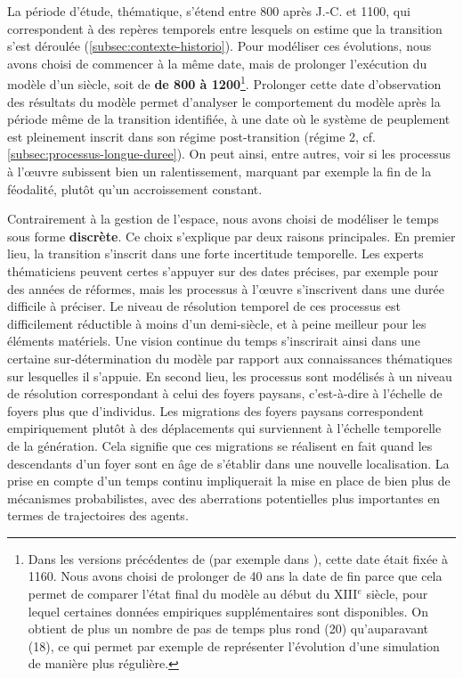 La période d'étude, thématique, s'étend entre 800 après J.-C. et 1100, qui correspondent à des repères temporels entre lesquels on estime que la transition s'est déroulée (\cref{subsec:contexte-historio}).
Pour modéliser ces évolutions, nous avons choisi de commencer à la même date, mais de prolonger l'exécution du modèle d'un siècle, soit de \textbf{de 800 à 1200}\footnote{
	Dans les versions précédentes de \simfeodal{} (par exemple dans \textcite{cura_transition_2017}), cette date était fixée à 1160.
	Nous avons choisi de prolonger de 40 ans la date de fin parce que cela 
	permet de comparer l'état final du modèle au début du XIII$^e$ siècle, pour lequel certaines données empiriques supplémentaires sont disponibles.
	On obtient de plus un nombre de pas de temps plus \og rond\fg{} (20) qu'auparavant (18), ce qui permet par exemple de représenter l'évolution d'une simulation de manière plus régulière.
}.
Prolonger cette date d'observation des résultats du modèle permet d'analyser le comportement du modèle après la période même de la transition identifiée, à une date où le système de peuplement est pleinement inscrit dans son régime post-transition (régime 2, cf. \cref{subsec:processus-longue-duree}).
On peut ainsi, entre autres, voir si les processus à l'œuvre subissent bien un ralentissement, marquant par exemple la fin de la féodalité, plutôt qu'un accroissement constant.

Contrairement à la gestion de l'espace, nous avons choisi de modéliser le temps sous forme \textbf{discrète}.
Ce choix s'explique par deux raisons principales.
En premier lieu, la transition s'inscrit dans une forte incertitude temporelle. 
Les experts thématiciens peuvent certes s'appuyer sur des dates précises, par exemple pour des années de réformes, mais les processus à l'œuvre s'inscrivent dans une durée difficile à préciser.
Le niveau de résolution temporel de ces processus est difficilement réductible à moins d'un demi-siècle, et à peine meilleur pour les éléments matériels.
Une vision continue du temps s'inscrirait ainsi dans une certaine sur-détermination du modèle par rapport aux connaissances thématiques sur lesquelles il s'appuie.
En second lieu, les processus sont modélisés à un niveau de résolution correspondant à celui des \og foyers paysans\fg{}, c'est-à-dire à l'échelle de foyers plus que d'individus.
Les migrations des foyers paysans correspondent empiriquement plutôt à des déplacements qui surviennent à l'échelle temporelle de la génération.
Cela signifie que ces migrations se réalisent en fait quand les descendants d'un foyer sont en âge de s'établir dans une nouvelle localisation.
La prise en compte d'un temps continu impliquerait la mise en place de bien plus de mécanismes probabilistes, avec des aberrations potentielles plus importantes en termes de trajectoires des agents.

